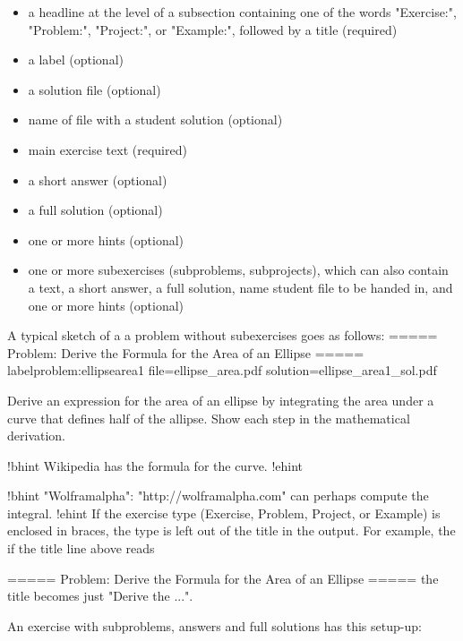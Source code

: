 \documentclass[%
oneside,                 %
final,                   %
10pt]{article}
\begin{document}
\begin{itemize}
  \item a headline at the level of a subsection
    containing one of the words "Exercise:", "Problem:",
    "Project:", or "Example:", followed by a title (required)

  \item a label (optional)

  \item a solution file (optional)

  \item name of file with a student solution (optional)

  \item main exercise text (required)

  \item a short answer (optional)

  \item a full solution (optional)

  \item one or more hints (optional)

  \item one or more subexercises (subproblems, subprojects), which can also
    contain a text, a short answer, a full solution, name student file
    to be handed in, and one or more hints (optional)
\end{itemize}

\noindent
A typical sketch of a a problem without subexercises goes as follows:
\bccq
===== Problem: Derive the Formula for the Area of an Ellipse =====
label{problem:ellipsearea1}
file=ellipse_area.pdf
solution=ellipse_area1_sol.pdf

Derive an expression for the area of an ellipse by integrating
the area under a curve that defines half of the allipse.
Show each step in the mathematical derivation.

!bhint
Wikipedia has the formula for the curve.
!ehint

!bhint
"Wolframalpha": "http://wolframalpha.com" can perhaps
compute the integral.
!ehint
\eccq
If the exercise type (Exercise, Problem, Project, or Example)
is enclosed in braces, the type is left out of the title in the
output. For example, the if the title line above reads

\bccq
===== {Problem}: Derive the Formula for the Area of an Ellipse =====
\eccq
the title becomes just "Derive the ...".

An exercise with subproblems, answers and full solutions has this
setup-up:
\end{document}

